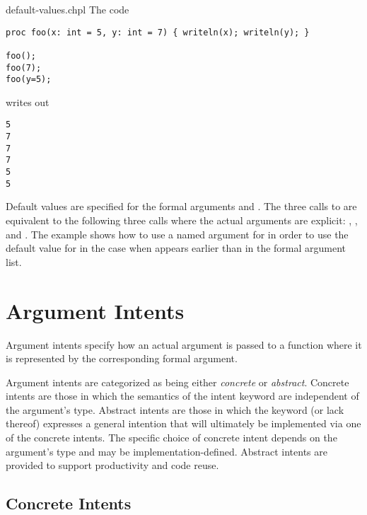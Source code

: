 \begin{chapelexample}{default-values.chpl}
The code
\begin{chapel}
\begin{verbatim}
proc foo(x: int = 5, y: int = 7) { writeln(x); writeln(y); }

foo();
foo(7);
foo(y=5);
\end{verbatim}
\end{chapel}
writes out
\begin{chapelprintoutput}
\begin{verbatim}
5
7
7
7
5
5
\end{verbatim}
\end{chapelprintoutput}
Default values are specified for the formal arguments 
and .  The three calls to  are equivalent to the
following three calls where the actual arguments are
explicit: , , and .
The example  shows how to use a named argument
for  in order to use the default value for  in the
case when  appears earlier than  in the formal
argument list.
\end{chapelexample}


\section{Argument Intents}
\label{Argument_Intents}

Argument intents specify how an actual argument is passed to a
function where it is represented by the corresponding formal argument.

Argument intents are categorized as being either \emph{concrete}
or \emph{abstract}.  Concrete intents are those in which the semantics
of the intent keyword are independent of the argument's type.
Abstract intents are those in which the keyword (or lack thereof)
expresses a general intention that will ultimately be implemented via
one of the concrete intents.  The specific choice of concrete intent
depends on the argument's type and may be implementation-defined.
Abstract intents are provided to support productivity and code reuse.

\subsection{Concrete Intents}
\label{Concrete Intents}

